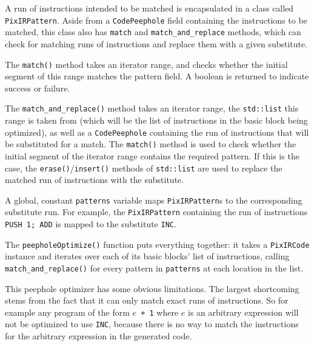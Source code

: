 \documentclass[11pt,a4paper]{scrartcl}
\begin{document}
A run of instructions intended to be matched is encapsulated in a class called \verb|PixIRPattern|. Aside from a \verb|CodePeephole| field containing the instructions to be matched, this class also has \verb|match| and \verb|match_and_replace| methods, which can check for matching runs of instructions and replace them with a given substitute.

The \verb|match()| method takes an iterator range, and checks whether the initial segment of this range matches the pattern field. A boolean is returned to indicate success or failure.

The \verb|match_and_replace()| method takes an iterator range, the \verb|std::list| this range is taken from (which will be the list of instructions in the basic block being optimized), as well as a \verb|CodePeephole| containing the run of instructions that will be substituted for a match. The \verb|match()| method is used to check whether the initial segment of the iterator range contains the required pattern. If this is the case, the \verb|erase()|/\verb|insert()| methods of \verb|std::list| are used to replace the matched run of instructions with the substitute.

A global, constant \verb|patterns| variable maps \verb|PixIRPattern|s to the corresponding substitute run. For example, the \verb|PixIRPattern| containing the run of instructions \verb|PUSH 1; ADD| is mapped to the substitute \verb|INC|.

The \verb|peepholeOptimize()| function puts everything together: it takes a \verb|PixIRCode| instance and iterates over each of its basic blocks' list of instructions, calling \verb|match_and_replace()| for every pattern in \verb|patterns| at each location in the list.

This peephole optimizer has some obvious limitations. The largest shortcoming stems from the fact that it can only match exact runs of instructions. So for example any program of the form $e$\verb| + 1| where $e$ is an arbitrary expression will not be optimized to use \verb|INC|, because there is no way to match the instructions for the arbitrary expression in the generated code.

\newpage



\end{document}
